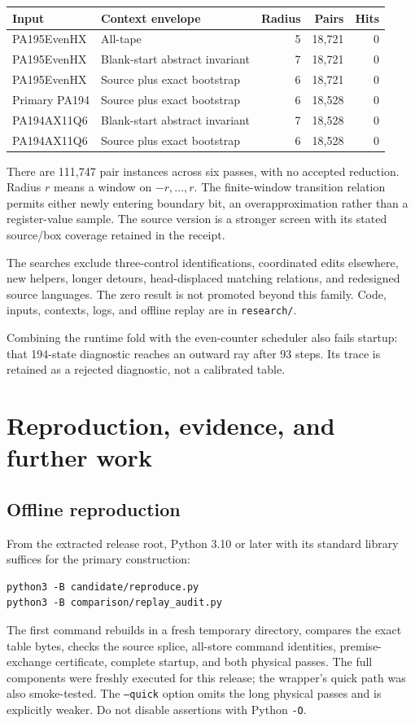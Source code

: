 \documentclass[10pt,letterpaper]{article}
\newcommand{\file}[1]{\texttt{\nolinkurl{#1}}}
\begin{document}
\begin{center}\small
\begin{tabular}{llrrr}
\toprule
Input & Context envelope & Radius & Pairs & Hits\\
\midrule
PA195EvenHX & All-tape & 5 & 18,721 & 0\\
PA195EvenHX & Blank-start abstract invariant & 7 & 18,721 & 0\\
PA195EvenHX & Source plus exact bootstrap & 6 & 18,721 & 0\\
Primary PA194 & Source plus exact bootstrap & 6 & 18,528 & 0\\
PA194AX11Q6 & Blank-start abstract invariant & 7 & 18,528 & 0\\
PA194AX11Q6 & Source plus exact bootstrap & 6 & 18,528 & 0\\
\bottomrule
\end{tabular}
\end{center}

There are 111,747 pair instances across six passes, with no accepted
reduction. Radius $r$ means a window on $-r,\ldots,r$.
The finite-window transition relation permits either newly entering
boundary bit, an overapproximation rather than a register-value sample.
The source version is a stronger screen with its stated source/box
coverage retained in the receipt.

The searches exclude three-control identifications, coordinated edits
elsewhere, new helpers, longer detours, head-displaced matching relations,
and redesigned source languages. The zero result is not promoted beyond
this family. Code, inputs, contexts, logs, and offline replay are in
\file{research/}.

Combining the runtime fold with the even-counter scheduler also fails
startup: that 194-state diagnostic reaches an outward ray after 93 steps.
Its trace is retained as a rejected diagnostic, not a calibrated table.



\section{Reproduction, evidence, and further work}

\subsection{Offline reproduction}

From the extracted release root, Python 3.10 or later with its standard
library suffices for the primary construction:
\begin{Verbatim}[fontsize=\small]
python3 -B candidate/reproduce.py
python3 -B comparison/replay_audit.py
\end{Verbatim}
The first command rebuilds in a fresh temporary directory, compares the
exact table bytes, checks the source splice, all-store command identities,
premise-exchange certificate, complete startup, and both physical passes.
The full components were freshly executed for this release; the wrapper's
quick path was also smoke-tested. The \texttt{--quick} option omits the
long physical passes and is explicitly weaker.
Do not disable assertions with Python \texttt{-O}.
\end{document}
